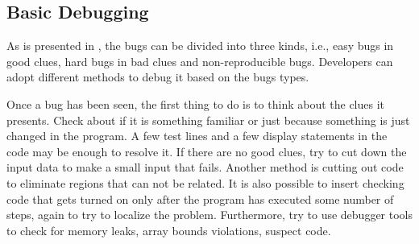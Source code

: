 \documentclass[draftclsnofoot,journal,onecolumn,12pt]{IEEEtran}
\begin{document}
\subsection{Basic Debugging}

As is presented in \cite{kernighan1999practice}, the bugs can be divided into three kinds, i.e., easy bugs in good clues, hard bugs in bad clues and non-reproducible bugs. Developers can adopt different methods to debug it based on the bugs types.

Once a bug has been seen, the first thing to do is to think about the clues it presents. Check about if it is something familiar or just because something is just changed in the program. A few test lines and a few display statements in the code may be enough to resolve it. If there are no good clues, try to cut down the input data to make a small input that fails. Another method is cutting out code to eliminate regions that can not be related. It is also possible to insert checking code that gets turned on only after the program has executed some number of steps, again to try to localize the problem. Furthermore, try to use debugger tools to check for memory leaks, array bounds violations, suspect code.
\end{document}
